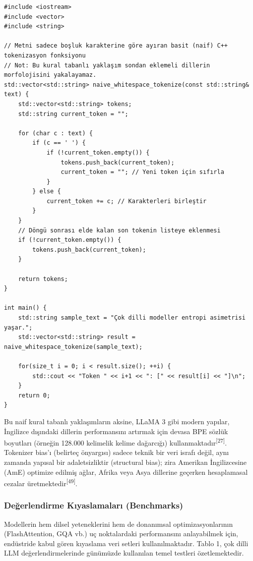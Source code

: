 \documentclass[11pt,a4paper]{article}
\begin{document}
\begin{Verbatim}[breaklines=true,breakanywhere=true,fontsize=\small]
#include <iostream>
#include <vector>
#include <string>

// Metni sadece boşluk karakterine göre ayıran basit (naif) C++ tokenizasyon fonksiyonu
// Not: Bu kural tabanlı yaklaşım sondan eklemeli dillerin morfolojisini yakalayamaz.
std::vector<std::string> naive_whitespace_tokenize(const std::string& text) {
    std::vector<std::string> tokens;
    std::string current_token = "";
    
    for (char c : text) {
        if (c == ' ') {
            if (!current_token.empty()) {
                tokens.push_back(current_token);
                current_token = ""; // Yeni token için sıfırla
            }
        } else {
            current_token += c; // Karakterleri birleştir
        }
    }
    // Döngü sonrası elde kalan son tokenin listeye eklenmesi
    if (!current_token.empty()) {
        tokens.push_back(current_token);
    }
    
    return tokens;
}

int main() {
    std::string sample_text = "Çok dilli modeller entropi asimetrisi yaşar.";
    std::vector<std::string> result = naive_whitespace_tokenize(sample_text);
    
    for(size_t i = 0; i < result.size(); ++i) {
        std::cout << "Token " << i+1 << ": [" << result[i] << "]\n";
    }
    return 0;
}
\end{Verbatim}
Bu naif kural tabanlı yaklaşımların aksine, LLaMA 3 gibi modern yapılar, İngilizce dışındaki dillerin performansını artırmak için devasa BPE sözlük boyutları (örneğin 128.000 kelimelik kelime dağarcığı) kullanmaktadır\textsuperscript{[27]}. Tokenizer bias'ı (belirteç önyargısı) sadece teknik bir veri israfı değil, aynı zamanda yapısal bir adaletsizliktir (structural bias); zira Amerikan İngilizcesine (AmE) optimize edilmiş ağlar, Afrika veya Asya dillerine geçerken hesaplamasal cezalar üretmektedir\textsuperscript{[49]}.

\subsubsection{Değerlendirme Kıyaslamaları (Benchmarks)}
Modellerin hem dilsel yeteneklerini hem de donanımsal optimizasyonlarının (FlashAttention, GQA vb.) uç noktalardaki performansını anlayabilmek için, endüstride kabul gören kıyaslama veri setleri kullanılmaktadır. Tablo 1, çok dilli LLM değerlendirmelerinde günümüzde kullanılan temel testleri özetlemektedir.
\end{document}
